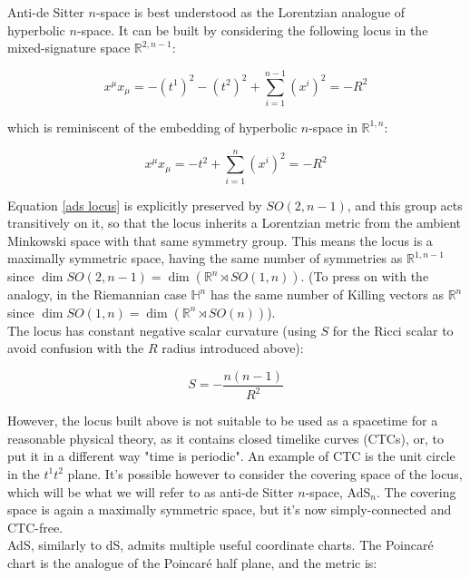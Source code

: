 \documentclass[11pt,a4paper,twoside,openright]{book}
\begin{document}
Anti-de Sitter $n$-space is best understood as the Lorentzian analogue of hyperbolic $n$-space. It can be built by considering the following locus in the mixed-signature space $\mathbb{R}^{2,n-1}$:

\begin{equation} \label{ads locus}
x^\mu x_\mu = -(t^1)^2 - (t^2)^2 + \sum_{i=1}^{n-1} (x^i)^2  =  - R^2
\end{equation}

which is reminiscent of the embedding of hyperbolic $n$-space in $\mathbb{R}^{1,n}$:

\begin{equation}
x^\mu x_\mu = -t^2 + \sum_{i=1}^{n} (x^i)^2 = - R^2
\end{equation}

Equation \ref{ads locus} is explicitly preserved by $SO(2,n-1)$, and this group acts transitively on it, so that the locus inherits a Lorentzian metric from the ambient Minkowski space with that same symmetry group. This means the locus is a maximally symmetric space, having the same number of symmetries as $\mathbb{R}^{1,n-1}$ since $\dim SO(2,n-1) = \dim \left( \mathbb{R}^n \rtimes SO(1,n) \right)$. (To press on with the analogy, in the Riemannian case $\mathbb{H}^n$ has the same number of Killing vectors as $\mathbb{R}^n$ since $\dim SO(1,n) = \dim \left(\mathbb{R}^n \rtimes SO(n) \right)$).\\

The locus has constant negative scalar curvature (using $S$ for the Ricci scalar to avoid confusion with the $R$ radius introduced above):

\begin{equation}
S = - \frac{n(n-1)}{R^2} 
\end{equation}

However, the locus built above is not suitable to be used as a spacetime for a reasonable physical theory, as it contains closed timelike curves (CTCs), or, to put it in a different way "time is periodic". An example of CTC is the unit circle in the $t^1 t^2$ plane. It's possible however to consider the covering space of the locus, which will be what we will refer to as anti-de Sitter $n$-space, AdS$_n$. The covering space is again a maximally symmetric space, but it's now simply-connected and CTC-free.\\

AdS, similarly to dS, admits multiple useful coordinate charts. The Poincaré chart is the analogue of the Poincaré half plane, and the metric is:
\end{document}
